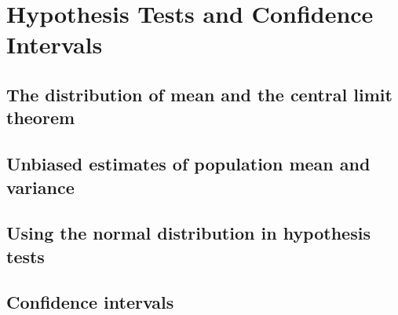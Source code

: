 \chapter{Hypothesis Tests and Confidence Intervals}

\section{The distribution of mean and the central limit theorem}
\section{Unbiased estimates of population mean and variance}
\section{Using the normal distribution in hypothesis tests}
\section{Confidence intervals}